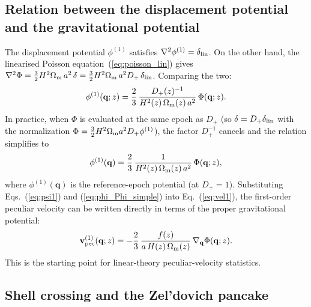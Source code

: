 \documentclass[12pt]{article}
\newcommand{\bq}{\mathbf{q}}
\newcommand{\bv}{\mathbf{v}}
\newcommand{\Dp}{D_+}
\newcommand{\Omm}{\Omega_{\rm m}}
\begin{document}
\subsection{Relation between the displacement potential and the
  gravitational potential}
\label{sec:phi_Phi}

The displacement potential $\phi^{(1)}$ satisfies
$\nabla^2\phi^{(1)} = \delta_{\rm lin}$.  On the other hand, the
linearised Poisson equation~(\ref{eq:poisson_lin}) gives
$\nabla^2\Phi = \tfrac{3}{2}H^2\Omm\,a^2\,\delta = \tfrac{3}{2}H^2\Omm\,a^2\Dp\,\delta_{\rm lin}$.
Comparing the two:
%
\begin{equation}
  \phi^{(1)}(\bq; z)
    = \frac{2}{3}\,\frac{\Dp(z)^{-1}}{H^2(z)\,\Omm(z)\,a^2}\,\Phi(\bq; z).
  \label{eq:phi_Phi}
\end{equation}
%
In practice, when $\Phi$ is evaluated at the same epoch as $\Dp$ (so
$\delta = \Dp\delta_{\rm lin}$ with the normalization
$\Phi = \frac{3}{2}H^2\Omm a^2\Dp\phi^{(1)}$), the factor $\Dp^{-1}$
cancels and the relation simplifies to
%
\begin{equation}
  \phi^{(1)}(\bq)
    = \frac{2}{3}\,\frac{1}{H^2(z)\,\Omm(z)\,a^2}\,\Phi(\bq; z),
  \label{eq:phi_Phi_simple}
\end{equation}
%
where $\phi^{(1)}(\bq)$ is the reference-epoch potential (at $\Dp=1$).
Substituting Eqs.~(\ref{eq:psi1}) and (\ref{eq:phi_Phi_simple}) into
Eq.~(\ref{eq:vel1}), the first-order peculiar velocity can be written
directly in terms of the proper gravitational potential:
%
\begin{equation}
  \bv_{\rm pec}^{(1)}(\bq; z)
    = -\frac{2}{3}\,\frac{f(z)}{a\,H(z)\,\Omm(z)}\,
      \nabla_\bq\Phi(\bq; z).
  \label{eq:vpec_Phi}
\end{equation}
%
This is the starting point for linear-theory peculiar-velocity
statistics.

\subsection{Shell crossing and the Zel'dovich pancake}
\label{sec:pancake}
\end{document}
